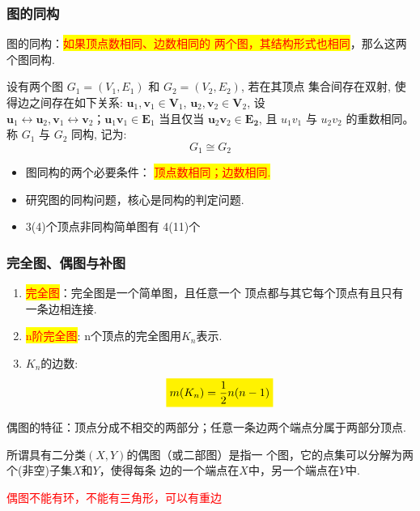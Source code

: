 \subsubsection{图的同构}
\noindent 图的同构：\colorbox{yellow}{\textcolor{red}{如果顶点数相同、边数相同的
		两个图，其结构形式也相同}}，那么这两个图同构.
\begin{definition}
	设有两个图 \( G_{1}=\left(V_{1}, E_{1}\right) \) 和 \( G_{2}=\left(V_{2}, E_{2}\right) \), 若在其顶点 集合间存在双射, 使得边之间存在如下关系: \( \mathbf{u}_{1}, \mathbf{v}_{1} \in \mathbf{V}_{1} \),
	\( \mathbf{u}_{2}, \mathbf{v}_{2} \in \mathbf{V}_{2} \), 设 \( \mathbf{u}_{1} \leftrightarrow \mathbf{u}_{2}, \mathbf{v}_{1} \leftrightarrow \mathbf{v}_{2} ； \mathbf{u}_{1} \mathbf{v}_{1} \in \mathbf{E}_{1} \) 当且仅当 \( \mathbf{u}_{2} \mathbf{v}_{2} \in \mathbf{E}_{\mathbf{2}} \), 且 \( u_{1} v_{1} \) 与 \( u_{2} v_{2} \) 的重数相同。称 \( G_{1} \) 与 \( G_{2} \) 同构, 记为:
	\[
	G_{1} \cong G_{2}
	\]
\end{definition}
\begin{note}
	\begin{itemize}
	\item 图同构的两个必要条件： \colorbox{yellow}{\textcolor{red}{顶点数相同；边数相同.}}
	\item 研究图的同构问题，核心是同构的判定问题.
	\item 3(4)个顶点非同构简单图有 4(11)个
	\end{itemize}
\end{note}

\subsubsection{完全图、偶图与补图}
\noindent {\bfseries \textcolor{ecolor}{完全图：}}
\begin{enumerate}
	\item \colorbox{yellow}{\textcolor{red}{完全图}}：完全图是一个简单图，且任意一个
		顶点都与其它每个顶点有且只有一条边相连接.
	\item \colorbox{yellow}{\textcolor{red}{n阶完全图}}: n个顶点的完全图用$K_n$表示.
	\item $K_n$的边数:
		\[
		\colorbox{yellow}{$m(K_n)=\dfrac{1}{2}n(n-1)$}
		\]
\end{enumerate}

\noindent {\bfseries \textcolor{ecolor}{偶图：}}

\noindent 偶图的特征：顶点分成不相交的两部分；任意一条边两个端点分属于两部分顶点.
\begin{definition}[偶图]
	所谓具有二分类$({X}, {Y})$的偶图（或二部图）是指一
	个图，它的点集可以分解为两个(非空)子集${X}$和${Y}$，使得每条
	边的一个端点在$X$中，另一个端点在$Y$中.
\end{definition}
\begin{note}
	\textcolor{red}{偶图不能有环，不能有三角形，可以有重边}
\end{note}



